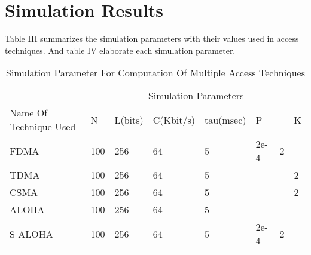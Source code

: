 \documentclass[11pt, conference, compsocconf, onecolumn]{IEEEtran}
\begin{document}
\section{Simulation Results}
Table III summarizes the simulation parameters with their values used in access techniques. And table IV elaborate each simulation parameter.
\begin{table*}
\caption{Simulation Parameter For Computation Of Multiple Access Techniques}
\begin{center}
\begin{tabular}{ | p{3cm} | p{1.5cm}| p{1.5cm}|p{1.5cm}|p{1.5cm}|p{1.5cm}|p{1.5cm}|p{1.5cm}|}
    \hline
    &\multicolumn {7}{c}{Simulation Parameters}\\ \cline{2-8}

     Name Of Technique Used & N & L(bits) & C(Kbit/s) & tau(msec)& P &  & K\\ \hline
     FDMA   & 100&256&64&5&2e-4	&2&  \\ \hline
     TDMA	& 100&256&64&5&	&&2  \\ \hline
     CSMA   & 100&256&64&5&  &&2  \\ \hline
     ALOHA  & 100&256&64&5&  &&  \\ \hline
     S ALOHA& 100&256&64&5&2e-4 &2&  \\ \hline
     \end{tabular}
     \end{center}
\end{table*}
\end{document}
